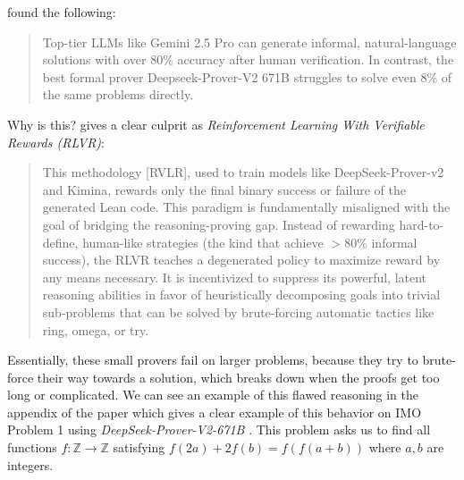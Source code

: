 \documentclass[12pt, letterpaper]{article}
\begin{document}
\citet{dekoninck2025openproofcorpuslargescale} found the following: \begin{quote}
    {Top-tier LLMs like Gemini 2.5
Pro can generate informal, natural-language solutions with over 80\% accuracy after human verification. In
contrast, the best formal prover Deepseek-Prover-V2 671B struggles to solve even 8\% of the same problems
directly.} \citet{dekoninck2025openproofcorpuslargescale}
\end{quote}

Why is this? \citet{zhou2025solvingformalmathproblems} gives a clear culprit as \textit{Reinforcement Learning
With Verifiable Rewards (RLVR)}: \begin{quote} {This methodology [RVLR], used to train models like DeepSeek-Prover-v2
and Kimina, rewards only the final binary success or failure of the generated Lean code. This
paradigm is fundamentally misaligned with the goal of bridging the reasoning-proving gap. Instead
of rewarding hard-to-define, human-like strategies (the kind that achieve $>$80\% informal success), the
RLVR teaches a degenerated policy to maximize reward by any means necessary. It is incentivized
to suppress its powerful, latent reasoning abilities in favor of heuristically decomposing goals into
trivial sub-problems that can be solved by brute-forcing automatic tactics like ring, omega, or try.} \citep{zhou2025solvingformalmathproblems} \end{quote}

Essentially, these small provers fail on larger problems, because they try to brute-force their way towards a solution, which breaks down when the proofs get too long or complicated. We can see an example of this flawed reasoning in the appendix of the paper which gives a clear example of this behavior on IMO Problem 1 using \textit{DeepSeek-Prover-V2-671B} \citet{ren2025deepseekproverv2advancingformalmathematical}. This problem asks us to find all functions $f: \mathbb {Z} \rightarrow \mathbb {Z} $ satisfying $f (2a) + 2 f (b) = f ( f (a + b)) $ where $a,b$ are integers.
\end{document}
